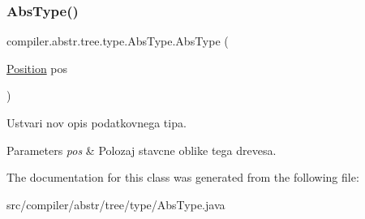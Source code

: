 \subsubsection{\texorpdfstring{Abs\+Type()}{AbsType()}}
{\footnotesize\ttfamily compiler.\+abstr.\+tree.\+type.\+Abs\+Type.\+Abs\+Type (\begin{DoxyParamCaption}\item[{\hyperlink{classcompiler_1_1_position}{Position}}]{pos }\end{DoxyParamCaption})}

Ustvari nov opis podatkovnega tipa.


\begin{DoxyParams}{Parameters}
{\em pos} & Polozaj stavcne oblike tega drevesa. \\
\hline
\end{DoxyParams}


The documentation for this class was generated from the following file\+:\begin{DoxyCompactItemize}
\item 
src/compiler/abstr/tree/type/Abs\+Type.\+java\end{DoxyCompactItemize}

